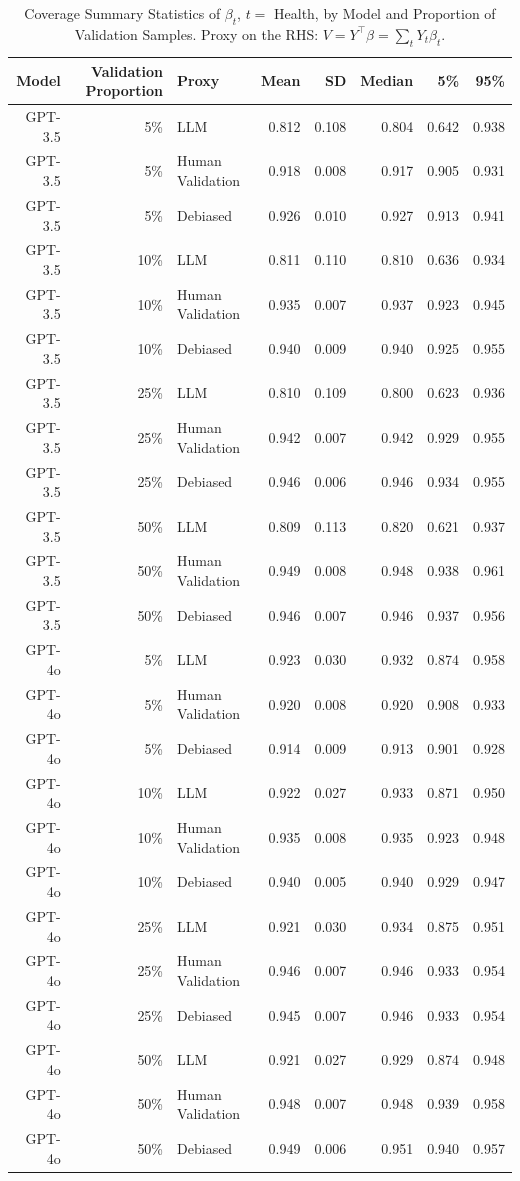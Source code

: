 \begin{table}

\caption{\label{tab:unnamed-chunk-1}Coverage Summary Statistics of $\beta_{t}$, $t=$ Health, by Model and Proportion of Validation Samples.
      Proxy on the RHS: $V = Y^\top \beta = \sum_{t} Y_t \beta_t$.}
\centering
\begin{tabular}[t]{rrlrrrrr}
\toprule
Model & Validation Proportion & Proxy & Mean & SD & Median & 5\% & 95\%\\
\midrule
GPT-3.5 & 5\% & LLM & 0.812 & 0.108 & 0.804 & 0.642 & 0.938\\
GPT-3.5 & 5\% & Human Validation & 0.918 & 0.008 & 0.917 & 0.905 & 0.931\\
GPT-3.5 & 5\% & Debiased & 0.926 & 0.010 & 0.927 & 0.913 & 0.941\\
GPT-3.5 & 10\% & LLM & 0.811 & 0.110 & 0.810 & 0.636 & 0.934\\
GPT-3.5 & 10\% & Human Validation & 0.935 & 0.007 & 0.937 & 0.923 & 0.945\\
GPT-3.5 & 10\% & Debiased & 0.940 & 0.009 & 0.940 & 0.925 & 0.955\\
GPT-3.5 & 25\% & LLM & 0.810 & 0.109 & 0.800 & 0.623 & 0.936\\
GPT-3.5 & 25\% & Human Validation & 0.942 & 0.007 & 0.942 & 0.929 & 0.955\\
GPT-3.5 & 25\% & Debiased & 0.946 & 0.006 & 0.946 & 0.934 & 0.955\\
GPT-3.5 & 50\% & LLM & 0.809 & 0.113 & 0.820 & 0.621 & 0.937\\
GPT-3.5 & 50\% & Human Validation & 0.949 & 0.008 & 0.948 & 0.938 & 0.961\\
GPT-3.5 & 50\% & Debiased & 0.946 & 0.007 & 0.946 & 0.937 & 0.956\\
GPT-4o & 5\% & LLM & 0.923 & 0.030 & 0.932 & 0.874 & 0.958\\
GPT-4o & 5\% & Human Validation & 0.920 & 0.008 & 0.920 & 0.908 & 0.933\\
GPT-4o & 5\% & Debiased & 0.914 & 0.009 & 0.913 & 0.901 & 0.928\\
GPT-4o & 10\% & LLM & 0.922 & 0.027 & 0.933 & 0.871 & 0.950\\
GPT-4o & 10\% & Human Validation & 0.935 & 0.008 & 0.935 & 0.923 & 0.948\\
GPT-4o & 10\% & Debiased & 0.940 & 0.005 & 0.940 & 0.929 & 0.947\\
GPT-4o & 25\% & LLM & 0.921 & 0.030 & 0.934 & 0.875 & 0.951\\
GPT-4o & 25\% & Human Validation & 0.946 & 0.007 & 0.946 & 0.933 & 0.954\\
GPT-4o & 25\% & Debiased & 0.945 & 0.007 & 0.946 & 0.933 & 0.954\\
GPT-4o & 50\% & LLM & 0.921 & 0.027 & 0.929 & 0.874 & 0.948\\
GPT-4o & 50\% & Human Validation & 0.948 & 0.007 & 0.948 & 0.939 & 0.958\\
GPT-4o & 50\% & Debiased & 0.949 & 0.006 & 0.951 & 0.940 & 0.957\\
\bottomrule
\end{tabular}
\end{table}
